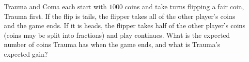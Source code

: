 Trauma and Coma each start with $1000$ coins and take turns flipping a fair coin, Trauma first. If the flip is tails, the flipper takes all of the other player's coins and the game ends. If it is heads, the flipper takes half of the other player's coins (coins may be split into fractions) and play continues. What is the expected number of coins Trauma has when the game ends, and what is Trauma's expected gain?
